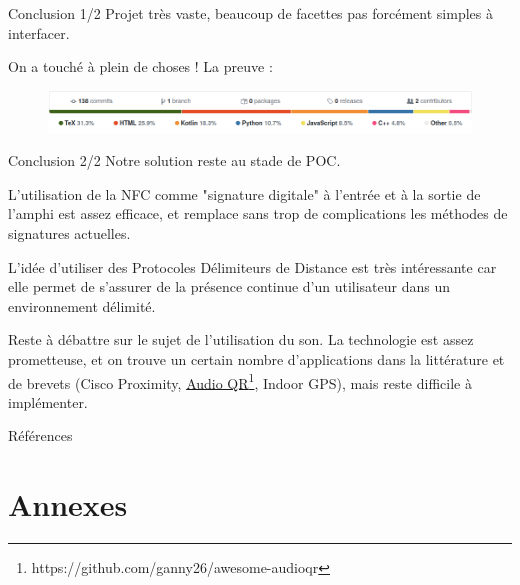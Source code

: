 \documentclass[aspectratio=169]{beamer}
\begin{document}
\begin{frame}{Conclusion 1/2}
  Projet très vaste, beaucoup de facettes pas forcément simples à interfacer.
  
  \bigskip
  
  On a touché à plein de choses ! La preuve :
  \begin{figure}
    \centering
    \includegraphics[width=\textwidth]{../assets/languages.png}
  \end{figure}
\end{frame}

\begin{frame}{Conclusion 2/2}
  Notre solution reste au stade de POC. 

  L'utilisation de la NFC comme "signature digitale" à l'entrée et à la sortie de l'amphi est assez efficace, et remplace sans trop de complications les méthodes de signatures actuelles. 

  L'idée d'utiliser des Protocoles Délimiteurs de Distance est très intéressante car elle permet de s'assurer de la présence continue d'un utilisateur dans un environnement délimité. 

  Reste à débattre sur le sujet de l'utilisation du son. La technologie est assez prometteuse, et on trouve un certain nombre d'applications dans la littérature et de brevets (Cisco Proximity, \href{https://github.com/ganny26/awesome-audioqr}{Audio QR\footnote{\url{https://github.com/ganny26/awesome-audioqr}}}, Indoor GPS), mais reste difficile à implémenter.

\end{frame}

\begin{frame}{Références}
  \printbibliography
\end{frame}


\section*{Annexes}

\appendix

\end{document}
